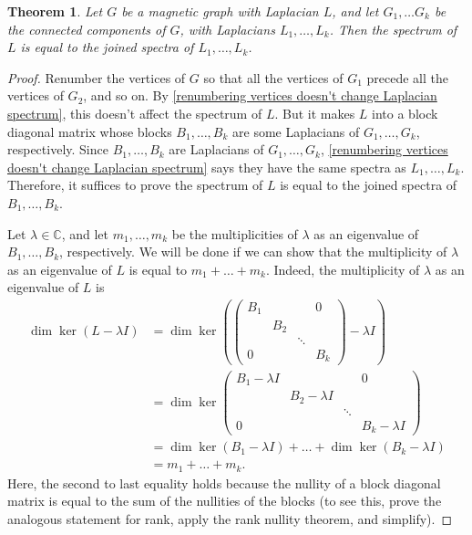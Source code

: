 \documentclass[12pt]{article}
\newtheorem{thm}{Theorem}
\theoremstyle{definition}
\newcommand{\C}{\mathbb C}
\begin{document}
\begin{thm}\label{spectrum is sum of spectra of connected components}
Let $G$ be a magnetic graph with Laplacian $L$, and let $G_1, \dots G_k$ be the connected components of $G$, with Laplacians $L_1, \dots, L_k$. Then the spectrum of $L$ is equal to the joined spectra of $L_1, \dots, L_k$.  
\end{thm}
\begin{proof}
Renumber the vertices of $G$ so that all the vertices of $G_1$ precede all the vertices of $G_2$, and so on. By \cref{renumbering vertices doesn't change Laplacian spectrum}, this doesn't affect the spectrum of $L$. But it makes $L$ into a block diagonal matrix whose blocks $B_1, \dots, B_k$ are some Laplacians of $G_1, \dots, G_k$, respectively. Since $B_1, \dots, B_k$ are Laplacians of $G_1, \dots, G_k$, \cref{renumbering vertices doesn't change Laplacian spectrum} says they have the same spectra as $L_1, \dots, L_k$. Therefore, it suffices to prove the spectrum of $L$ is equal to the joined spectra of $B_1, \dots, B_k$.

Let $\lambda \in \C$, and let $m_1, \dots, m_k$ be the multiplicities of $\lambda$ as an eigenvalue of $B_1, \dots, B_k$, respectively. We will be done if we can show that the multiplicity of $\lambda$ as an eigenvalue of $L$ is equal to $m_1 + \dots + m_k$. Indeed, the multiplicity of $\lambda$ as an eigenvalue of $L$ is
\begin{align*}
\dim \ker (L - \lambda I)
&= \dim \ker \left(
\begin{pmatrix}
B_1 &  &  & 0 \\
 & B_2 &  &  \\
  &   & \ddots &  \\
0 &  &  & B_k 
\end{pmatrix} 
- \lambda I
\right) \\
&= \dim \ker
\begin{pmatrix}
B_1 - \lambda I &  &  & 0 \\
 & B_2 - \lambda I &  &  \\
  &   & \ddots &  \\
0 &  &  & B_k - \lambda I
\end{pmatrix} \\
&= \dim \ker (B_1 - \lambda I) + \dots + \dim \ker (B_k - \lambda I) \\
&= m_1 + \dots + m_k.
\end{align*}
Here, the second to last equality holds because the nullity of a block diagonal matrix is equal to the sum of the nullities of the blocks (to see this, prove the analogous statement for rank, apply the rank nullity theorem, and simplify).
\end{proof}
\end{document}
